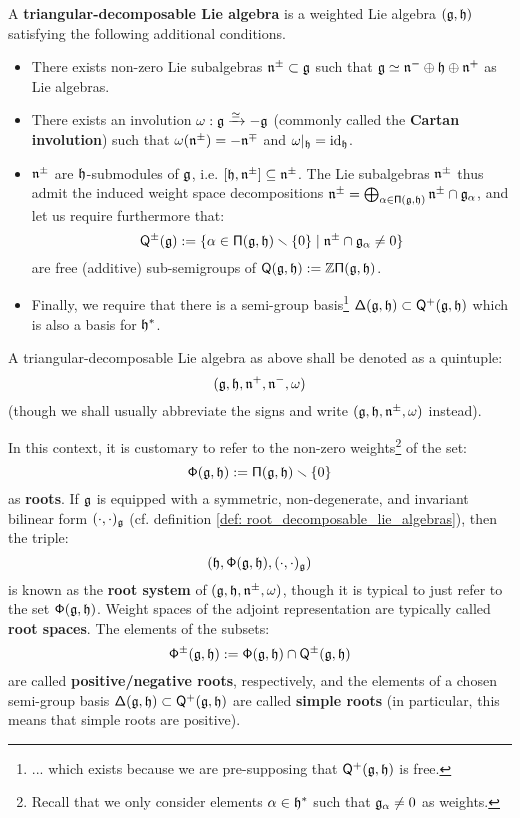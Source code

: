        \begin{definition} \label{def: triangular_decomposable_lie_algebras}
            A \textbf{triangular-decomposable Lie algebra} is a weighted Lie algebra $(\mathfrak{g}, \mathfrak{h})$ satisfying the following additional conditions.
            \begin{itemize}
                \item There exists non-zero Lie subalgebras $\mathfrak{n}^{\pm} \subset \mathfrak{g}$ such that $\mathfrak{g} \simeq \mathfrak{n}^- \oplus \mathfrak{h} \oplus \mathfrak{n}^+$ as Lie algebras.
                \item There exists an involution $\omega: \mathfrak{g} \xrightarrow[]{\simeq} -\mathfrak{g}$ (commonly called the \textbf{Cartan involution}) such that $\omega(\mathfrak{n}^{\pm}) = -\mathfrak{n}^{\mp}$ and $\omega|_{\mathfrak{h}} = \mathrm{id}_{\mathfrak{h}}$.
                \item $\mathfrak{n}^{\pm}$ are $\mathfrak{h}$-submodules of $\mathfrak{g}$, i.e. $[\mathfrak{h}, \mathfrak{n}^{\pm}] \subseteq \mathfrak{n}^{\pm}$. The Lie subalgebras $\mathfrak{n}^{\pm}$ thus admit the induced weight space decompositions $\mathfrak{n}^{\pm} = \bigoplus_{\alpha \in \mathsf{\Pi}(\mathfrak{g}, \mathfrak{h})} \mathfrak{n}^{\pm} \cap \mathfrak{g}_{\alpha}$, and let us require furthermore that:
                    $$\mathsf{Q}^{\pm}(\mathfrak{g}) := \{ \alpha \in \mathsf{\Pi}(\mathfrak{g}, \mathfrak{h}) \smallsetminus \{0\} \mid \mathfrak{n}^{\pm} \cap \mathfrak{g}_{\alpha} \not = 0 \}$$
                are free (additive) sub-semigroups of $\mathsf{Q}(\mathfrak{g}, \mathfrak{h}) := \mathbb{Z}\mathsf{\Pi}(\mathfrak{g}, \mathfrak{h})$.
                \item Finally, we require that there is a semi-group basis\footnote{... which exists because we are pre-supposing that $\mathsf{Q}^+(\mathfrak{g}, \mathfrak{h})$ is free.} $\mathsf{\Delta}(\mathfrak{g}, \mathfrak{h}) \subset \mathsf{Q}^+(\mathfrak{g}, \mathfrak{h})$ which is also a basis for $\mathfrak{h}^*$.
            \end{itemize}
            A triangular-decomposable Lie algebra as above shall be denoted as a quintuple:
                $$(\mathfrak{g}, \mathfrak{h}, \mathfrak{n}^+, \mathfrak{n}^-, \omega)$$
            (though we shall usually abbreviate the signs and write $(\mathfrak{g}, \mathfrak{h}, \mathfrak{n}^{\pm}, \omega)$ instead).
        \end{definition}
        \begin{convention}
            In this context, it is customary to refer to the non-zero weights\footnote{Recall that we only consider elements $\alpha \in \mathfrak{h}^*$ such that $\mathfrak{g}_{\alpha} \not = 0$ as weights.} of the set:
                $$\mathsf{\Phi}(\mathfrak{g}, \mathfrak{h}) := \mathsf{\Pi}(\mathfrak{g}, \mathfrak{h}) \smallsetminus \{0\}$$
            as \textbf{roots}. If $\mathfrak{g}$ is equipped with a symmetric, non-degenerate, and invariant bilinear form $(\cdot, \cdot)_{\mathfrak{g}}$ (cf. definition \ref{def: root_decomposable_lie_algebras}), then the triple:
                $$( \mathfrak{h}, \mathsf{\Phi}(\mathfrak{g}, \mathfrak{h}), (\cdot, \cdot)_{\mathfrak{g}} )$$
            is known as the \textbf{root system} of $(\mathfrak{g}, \mathfrak{h}, \mathfrak{n}^{\pm}, \omega)$, though it is typical to just refer to the set $\mathsf{\Phi}(\mathfrak{g}, \mathfrak{h})$. Weight spaces of the adjoint representation are typically called \textbf{root spaces}. The elements of the subsets:
                $$\mathsf{\Phi}^{\pm}(\mathfrak{g}, \mathfrak{h}) := \mathsf{\Phi}(\mathfrak{g}, \mathfrak{h}) \cap \mathsf{Q}^{\pm}(\mathfrak{g}, \mathfrak{h})$$
            are called \textbf{positive/negative roots}, respectively, and the elements of a chosen semi-group basis $\mathsf{\Delta}(\mathfrak{g}, \mathfrak{h}) \subset \mathsf{Q}^+(\mathfrak{g}, \mathfrak{h})$ are called \textbf{simple roots} (in particular, this means that simple roots are positive).
        \end{convention}
